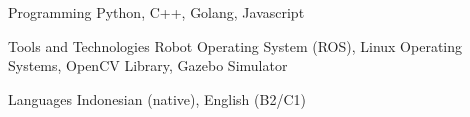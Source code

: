 

\begin{cvskills}

  \cvskill
    {Programming} %
    {Python, C++, Golang, Javascript} %

  \cvskill
    {Tools and Technologies} %
    {Robot Operating System (ROS), Linux Operating Systems, OpenCV Library, Gazebo Simulator} %

  \cvskill
    {Languages} %
    {Indonesian (native), English (B2/C1)} %

\end{cvskills}
